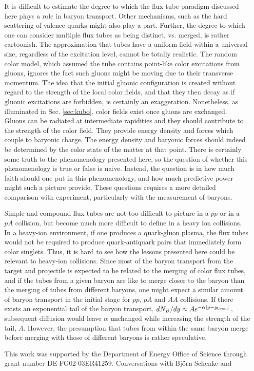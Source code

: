 \documentclass[aps, prc, 12pt, nofootinbib, showpacs, superscriptaddress, tightenlines, groupedaddress]{revtex4-2}
\begin{document}
It is difficult to estimate the degree to which the flux tube paradigm discussed here plays a role in baryon transport. Other mechanisms, such as the hard scattering of valence quarks might also play a part. Further, the degree to which one can consider multiple flux tubes as being distinct, vs. merged, is rather cartoonish. The approximation that tubes have a uniform field within a universal size, regardless of the excitation level, cannot be totally realistic. The random color model, which assumed the tube contains point-like color excitations from gluons, ignores the fact such gluons might be moving due to their transverse momentum. The idea that the initial gluonic configuration is created without regard to the strength of the local color fields, and that they then decay as if gluonic excitations are forbidden, is certainly an exaggeration.  Nonetheless, as illuminated in Sec. \ref{sec:kubo}, color fields exist once gluons are exchanged. Gluons can be radiated at intermediate rapidities and they should contribute to the strength of the color field. They provide energy density and forces which couple to baryonic charge. The energy density and baryonic forces should indeed be determined by the color state of the matter at that point. There is certainly some truth to the phenomenology presented here, so the question of whether this phenomenology is true or false is naive. Instead, the question is in how much faith should one put in this phenomenology, and how much predictive power might such a picture provide. These questions requires a more detailed comparison with experiment, particularly with the measurement of baryons. 

Simple and compound flux tubes are not too difficult to picture in a $pp$ or in a $pA$ collision, but become much more difficult to define in a heavy ion collisions. In a heavy-ion environment, if one produces a quark-gluon plasma, the flux tubes would not be required to produce quark-antiquark pairs that immediately form color singlets. Thus, it is hard to see how the lessons presented here could be relevant to heavy-ion collisions. Since most of the baryon transport from the target and projectile is expected to be related to the merging of color flux tubes, and if the tubes from a given baryon are like to merge closer to the baryon than the merging of tubes from different baryons, one might expect a similar amount of baryon transport in the initial stage for $pp$, $pA$ and $AA$ collisions. If there exists an exponential tail of the baryon transport, $dN_B/dy \approx Ae^{-\alpha|y-y_{\rm beam}|}$, subsequent diffusion would leave $\alpha$ unchanged while increasing the strength of the tail, $A$. However, the presumption that tubes from within the same baryon merge before merging with those of different baryons is rather speculative. 


\begin{acknowledgments}
This work was supported by the Department of Energy Office of Science through grant number DE-FG02-03ER41259. Conversations with Bj\"orn Schenke and 
\end{acknowledgments}


\end{document}
